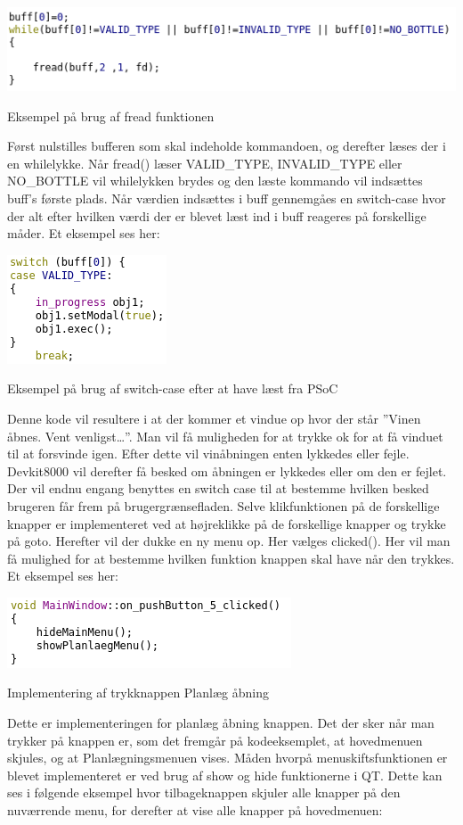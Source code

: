 \includegraphics{Billeder/read}
\caption{Eksempel på brug af fread funktionen}

Først nulstilles bufferen som skal indeholde kommandoen, og derefter læses der i en whilelykke. Når fread() læser VALID_TYPE, INVALID_TYPE eller NO_BOTTLE vil whilelykken brydes og den læste kommando vil indsættes buff’s første plads. Når værdien indsættes i buff gennemgåes en switch-case hvor der alt efter hvilken værdi der er blevet læst ind i buff reageres på forskellige måder. Et eksempel ses her:

\includegraphics{Billeder/switch}
\caption{Eksempel på brug af switch-case efter at have læst fra PSoC}

Denne kode vil resultere i at der kommer et vindue op hvor der står ”Vinen åbnes. Vent venligst…”. Man vil få muligheden for at trykke ok for at få vinduet til at forsvinde igen. 
Efter dette vil vinåbningen enten lykkedes eller fejle. Devkit8000 vil derefter få besked om åbningen er lykkedes eller om den er fejlet. Der vil endnu engang benyttes en switch case til at bestemme hvilken besked brugeren får frem på brugergrænsefladen.
Selve klikfunktionen på de forskellige knapper er implementeret ved at højreklikke på de forskellige knapper og trykke på goto. Herefter vil der dukke en ny menu op. Her vælges clicked(). Her vil man få mulighed for at bestemme hvilken funktion knappen skal have når den trykkes. Et eksempel ses her:

\includegraphics{Billeder/pushButton}
\caption{Implementering af trykknappen Planlæg åbning}

Dette er implementeringen for planlæg åbning knappen. Det der sker når man trykker på knappen er, som det fremgår på kodeeksemplet, at hovedmenuen skjules, og at Planlægningsmenuen vises. 
Måden hvorpå menuskiftsfunktionen er blevet implementeret er ved brug af show og hide funktionerne i QT. Dette kan ses i følgende eksempel hvor tilbageknappen skjuler alle knapper på den nuværrende menu, for derefter at vise alle knapper på hovedmenuen:

